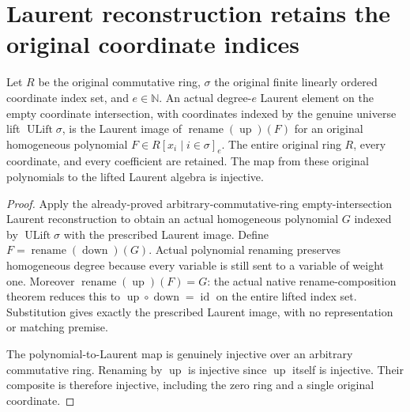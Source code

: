 \section{Laurent reconstruction retains the original coordinate indices}
\label{sec:c0n-section-polynomial-rename}

\begin{lemma}
\label{lem:c0n-polynomial-original-index-reconstruction}
\leanok
{}
Let $R$ be the original commutative ring, $\sigma$ the original finite
linearly ordered coordinate index set, and $e\in\mathbb N$. An actual
degree-$e$ Laurent element on the empty coordinate intersection, with
coordinates indexed by the genuine universe lift $\operatorname{ULift}
\sigma$, is the Laurent image of
$\operatorname{rename}(\operatorname{up})(F)$ for an original homogeneous
polynomial $F\in R[x_i\mid i\in\sigma]_e$. The entire original ring $R$,
every coordinate, and every coefficient are retained. The map from these
original polynomials to the lifted Laurent algebra is injective.
\end{lemma}
\begin{proof}
Apply the already-proved arbitrary-commutative-ring empty-intersection
Laurent reconstruction to obtain an actual homogeneous polynomial $G$
indexed by $\operatorname{ULift}\sigma$ with the prescribed Laurent image.
Define $F=\operatorname{rename}(\operatorname{down})(G)$. Actual polynomial
renaming preserves homogeneous degree because every variable is still sent
to a variable of weight one. Moreover
$\operatorname{rename}(\operatorname{up})(F)=G$: the actual native
rename-composition theorem reduces this to
$\operatorname{up}\circ\operatorname{down}=\operatorname{id}$ on the
entire lifted index set. Substitution gives exactly the prescribed Laurent
image, with no representation or matching premise.

The polynomial-to-Laurent map is genuinely injective over an arbitrary
commutative ring. Renaming by $\operatorname{up}$ is injective since
$\operatorname{up}$ itself is injective. Their composite is therefore
injective, including the zero ring and a single original coordinate.
\end{proof}

